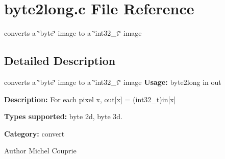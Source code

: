 \section{byte2long.c File Reference}
\label{byte2long_8c}


converts a \char`\"{}byte\char`\"{} image to a \char`\"{}int32\_\-t\char`\"{} image  




\subsection{Detailed Description}
converts a \char`\"{}byte\char`\"{} image to a \char`\"{}int32\_\-t\char`\"{} image {\bfseries Usage:} byte2long in out

{\bfseries Description:} For each pixel x, out[x] = (int32\_\-t)in[x]

{\bfseries Types supported:} byte 2d, byte 3d.

{\bfseries Category:} convert

\begin{DoxyAuthor}{Author}
Michel Couprie 
\end{DoxyAuthor}
